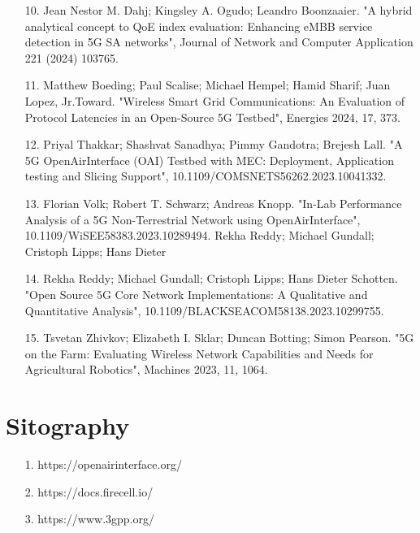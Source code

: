 \documentclass{report}
\begin{document}
\begin{itemize}
\item[10.] Jean Nestor M. Dahj; Kingsley A. Ogudo; Leandro Boonzaaier. "A hybrid analytical concept to QoE index evaluation: Enhancing eMBB service detection in 5G SA networks", Journal of Network and Computer Application 221 (2024) 103765.
\item[11.] Matthew Boeding; Paul Scalise; Michael Hempel; Hamid Sharif; Juan Lopez, Jr.Toward. "Wireless Smart Grid Communications: An Evaluation of Protocol Latencies in an Open-Source 5G Testbed", Energies 2024, 17, 373.
\item[12.] Priyal Thakkar; Shashvat Sanadhya; Pimmy Gandotra; Brejesh Lall. "A 5G OpenAirInterface (OAI) Testbed with MEC: Deployment, Application testing and Slicing Support", 10.1109/COMSNETS56262.2023.10041332.
\item[13.] Florian Volk; Robert T. Schwarz; Andreas Knopp. "In-Lab Performance Analysis of a 5G Non-Terrestrial Network using OpenAirInterface", 10.1109/WiSEE58383.2023.10289494.
Rekha Reddy; Michael Gundall; Cristoph Lipps; Hans Dieter \item[14.] Rekha Reddy; Michael Gundall; Cristoph Lipps; Hans Dieter Schotten. "Open Source 5G Core Network Implementations: A Qualitative and Quantitative Analysis", 10.1109/BLACKSEACOM58138.2023.10299755.
\item[15.] Tsvetan Zhivkov; Elizabeth I. Sklar; Duncan Botting; Simon Pearson. "5G on the Farm: Evaluating Wireless Network Capabilities and Needs for Agricultural Robotics", Machines 2023, 11, 1064.
\end{itemize}
\chapter{Sitography}
\begin{itemize}
	\item[1.] https://openairinterface.org/
	\item[2.] https://docs.firecell.io/
	\item[3.] https://www.3gpp.org/
\end{itemize}
\end{document}

